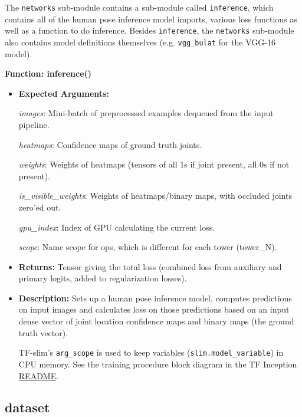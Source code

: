 \documentclass{scrreprt}
\begin{document}
The \verb|networks| sub-module contains a sub-module called \verb|inference|,
which contains all of the human pose inference model imports, various loss
functions as well as a function to do inference. Besides \verb|inference|, the
\verb|networks| sub-module also contains model definitions themselves (e.g.
\verb|vgg_bulat| for the VGG-16 model).

\textbf{Function: inference()}

\begin{itemize}
        \item \textbf{Expected Arguments:}

        \textit{images}: Mini-batch of preprocessed examples dequeued from the
                input pipeline.

        \textit{heatmaps}: Confidence maps of ground truth joints.

        \textit{weights}: Weights of heatmaps (tensors of all 1s if joint
                present, all 0s if not present).

        \textit{is\_visible\_weights}: Weights of heatmaps/binary maps, with
                occluded joints zero'ed out.

        \textit{gpu\_index}: Index of GPU calculating the current loss.

        \textit{scope}: Name scope for ops, which is different for each tower
                (tower\_N).

        \item \textbf{Returns:} Tensor giving the total loss (combined loss
                from auxiliary and primary logits, added to regularization
                losses).

        \item \textbf{Description:} Sets up a human pose inference model,
                computes predictions on input images and calculates loss on
                those predictions based on an input dense vector of joint
                location confidence maps and binary maps (the ground truth
                vector).

                TF-slim's \verb|arg_scope| is used to keep variables
                (\verb|slim.model_variable|) in CPU memory. See the training
                procedure block diagram in the TF Inception
                \href{https://github.com/tensorflow/models/tree/master/inception}{README}.
\end{itemize}

\subsection{dataset}
\end{document}
